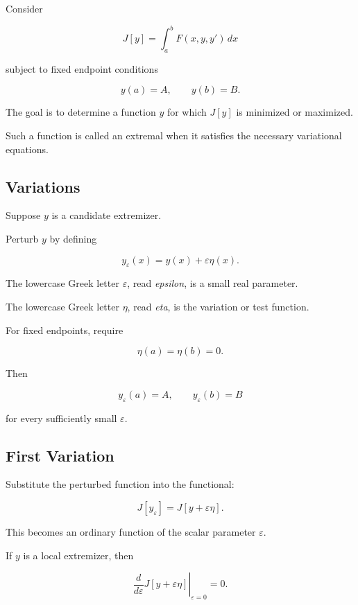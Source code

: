 Consider

\[
\boxed{
J[y]
=
\int_a^b
F(x,y,y')\,dx
}
\]

subject to fixed endpoint conditions

\[
\boxed{
y(a)=A,
\qquad
y(b)=B.
}
\]

The goal is to determine a function \(y\) for which \(J[y]\) is minimized
or maximized.

Such a function is called an extremal when it satisfies the necessary
variational equations.

\subsection{Variations}
\label{subsec:variations}

Suppose \(y\) is a candidate extremizer.

Perturb \(y\) by defining

\[
\boxed{
y_\varepsilon(x)
=
y(x)+\varepsilon\eta(x).
}
\]

The lowercase Greek letter \(\varepsilon\), read \emph{epsilon}, is a
small real parameter.

The lowercase Greek letter \(\eta\), read \emph{eta}, is the variation
or test function.

For fixed endpoints, require

\[
\boxed{
\eta(a)=\eta(b)=0.
}
\]

Then

\[
y_\varepsilon(a)=A,
\qquad
y_\varepsilon(b)=B
\]

for every sufficiently small \(\varepsilon\).

\subsection{First Variation}
\label{subsec:first-variation}

Substitute the perturbed function into the functional:

\[
J[y_\varepsilon]
=
J[y+\varepsilon\eta].
\]

This becomes an ordinary function of the scalar parameter
\(\varepsilon\).

If \(y\) is a local extremizer, then

\[
\boxed{
\left.
\frac{d}{d\varepsilon}
J[y+\varepsilon\eta]
\right|_{\varepsilon=0}
=
0.
}
\]

